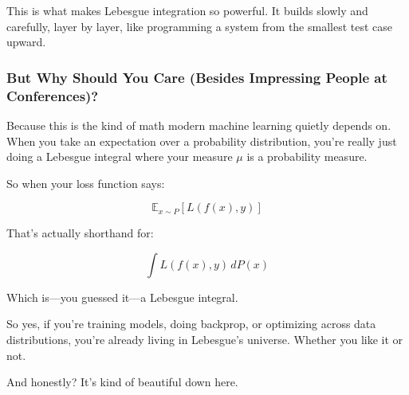 This is what makes Lebesgue integration so powerful. It builds slowly and carefully, layer by layer, like programming a system from the smallest test case upward.

\subsubsection{But Why Should You Care (Besides Impressing People at Conferences)?}

Because this is the kind of math modern machine learning quietly depends on. When you take an expectation over a probability distribution, you’re really just doing a Lebesgue integral where your measure \( \mu \) is a probability measure.

So when your loss function says:

\[
\mathbb{E}_{x \sim P}[L(f(x), y)]
\]

That’s actually shorthand for:

\[
\int L(f(x), y) \, dP(x)
\]

Which is—you guessed it—a Lebesgue integral.

So yes, if you're training models, doing backprop, or optimizing across data distributions, you're already living in Lebesgue's universe. Whether you like it or not.

And honestly? It’s kind of beautiful down here.